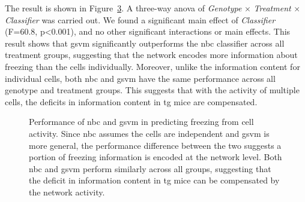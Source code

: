 The result is shown in Figure~\ref{f.ad.classifier}. A three-way \gls{anova} of \textit{Genotype} $\times$ \textit{Treatment} $\times$ \textit{Classifier} was carried out. We found a significant main effect of \textit{Classifier} (F=60.8, p<0.001), and no other significant interactions or main effects. This result shows that \gls{gsvm} significantly outperforms the \gls{nbc} classifier across all treatment groups, suggesting that the network encodes more information about freezing than the cells individually. Moreover, unlike the information content for individual cells, both \gls{nbc} and \gls{gsvm} have the same performance across all genotype and treatment groups. This suggests that with the activity of multiple cells, the deficits in information content in \gls{tg} mice are compensated. 

\begin{figure}[h]
    \begin{subfigure}[b]{0.5\textwidth}
        
        \caption{\label{f.ad.nb}}
    \end{subfigure}
    \begin{subfigure}[b]{0.5\textwidth}
        
        \caption{\label{f.ad.svm}}
    \end{subfigure}
    \caption[Accuracy of machine learning classifier in predicting freezing.]{Performance of  \gls{nbc} and  \gls{gsvm} in predicting freezing from cell activity. Since \gls{nbc} assumes the cells are independent and \gls{gsvm} is more general, the performance difference between the two suggests a portion of freezing information is encoded at the network level. Both \gls{nbc} and \gls{gsvm} perform similarly across all groups, suggesting that the deficit in information content in \gls{tg} mice can be compensated by the network activity. \label{f.ad.classifier}}
\end{figure}

